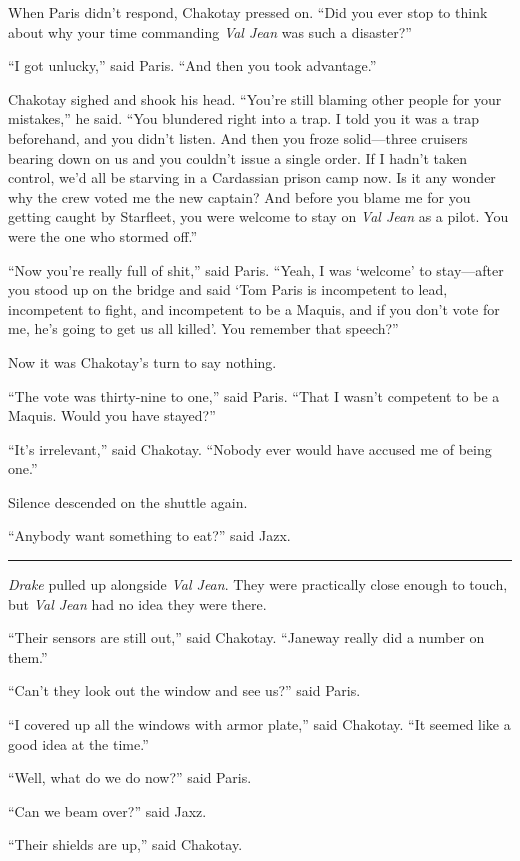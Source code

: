 \documentclass[twoside,letterpaper,12pt]{memoir}
\begin{document}
When Paris didn't respond, Chakotay pressed on. ``Did you ever stop to think about why your time commanding \textit{Val Jean} was such a disaster?''

``I got unlucky,'' said Paris. ``And then you took advantage.''

Chakotay sighed and shook his head. ``You're still blaming other people for your mistakes,'' he said. ``You blundered right into a trap. I told you it was a trap beforehand, and you didn't listen. And then you froze solid---three cruisers bearing down on us and you couldn't issue a single order. If I hadn't taken control, we'd all be starving in a Cardassian prison camp now. Is it any wonder why the crew voted me the new captain? And before you blame me for you getting caught by Starfleet, you were welcome to stay on \textit{Val Jean} as a pilot. You were the one who stormed off.''

``Now you're really full of shit,'' said Paris. ``Yeah, I was `welcome' to stay---after you stood up on the bridge and said `Tom Paris is incompetent to lead, incompetent to fight, and incompetent to be a Maquis, and if you don't vote for me, he's going to get us all killed'. You remember that speech?''

Now it was Chakotay's turn to say nothing.

``The vote was thirty-nine to one,'' said Paris. ``That I wasn't competent to be a Maquis. Would you have stayed?''

``It's irrelevant,'' said Chakotay. ``Nobody ever would have accused me of being one.''

Silence descended on the shuttle again.

``Anybody want something to eat?'' said Jazx.

\fancybreak{\rule{3cm}{0.4 pt}}
\textit{Drake} pulled up alongside \textit{Val Jean}. They were practically close enough to touch, but \textit{Val Jean} had no idea they were there.

``Their sensors are still out,'' said Chakotay. ``Janeway really did a number on them.''

``Can't they look out the window and see us?'' said Paris.

``I covered up all the windows with armor plate,'' said Chakotay. ``It seemed like a good idea at the time.''

``Well, what do we do now?'' said Paris.

``Can we beam over?'' said Jaxz.

``Their shields are up,'' said Chakotay.
\end{document}
